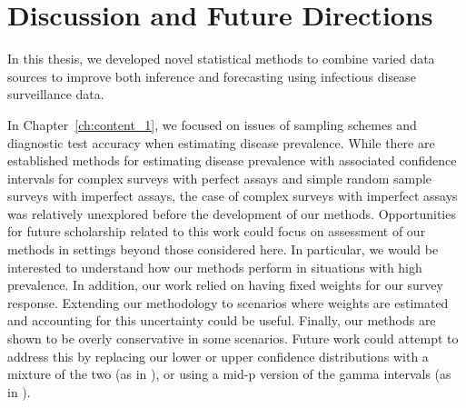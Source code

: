 \chapter{Discussion and Future Directions}
\label{ch:discussion}

In this thesis, we developed novel statistical methods to combine varied data sources to improve both inference and forecasting using infectious disease surveillance data.

In Chapter~\ref{ch:content_1}, we focused on issues of sampling schemes and diagnostic test accuracy when estimating disease prevalence.
While there are established methods for estimating disease prevalence with associated confidence intervals for complex surveys with perfect assays and simple random sample surveys with imperfect assays, the case of complex surveys with imperfect assays was relatively unexplored before the development of our methods.
Opportunities for future scholarship related to this work could focus on assessment of our methods in settings beyond those considered here.
In particular, we would be interested to understand how our methods perform in situations with high prevalence.
In addition, our work relied on having fixed weights for our survey response.
Extending our methodology to scenarios where weights are estimated and accounting for this uncertainty could be useful.
Finally, our methods are shown to be overly conservative in some scenarios.
Future work could attempt to address this by replacing our lower or upper confidence distributions with a mixture of the two (as in \citep{veronese2015}), or using a mid-p version of the gamma intervals (as in \citep{FayK:2017}).

